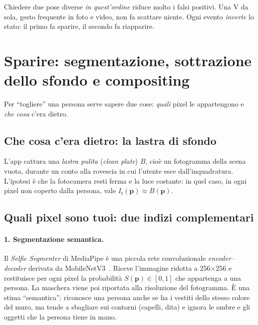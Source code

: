 \documentclass[11pt,a4paper]{article}
\newcommand{\vect}[1]{\mathbf{#1}}
\begin{document}
Chiedere due pose diverse \emph{in quest'ordine} riduce molto i falsi positivi. Una V da sola,
gesto frequente in foto e video, non fa scattare niente. Ogni evento \emph{inverte} lo stato:
il primo fa sparire, il secondo fa riapparire.

\section{Sparire: segmentazione, sottrazione dello sfondo e compositing}
\label{sec:sparire}

Per ``togliere'' una persona serve sapere due cose: \emph{quali} pixel le appartengono e
\emph{che cosa} c'era dietro.

\subsection{Che cosa c'era dietro: la lastra di sfondo}
L'app cattura una \emph{lastra pulita} (\emph{clean plate}) $B$, cioè un fotogramma della scena
vuota, durante un conto alla rovescia in cui l'utente esce dall'inquadratura. L'ipotesi è che la
fotocamera resti ferma e la luce costante: in quel caso, in ogni pixel non coperto dalla persona,
vale $I_t(\vect{p})\approx B(\vect{p})$.

\subsection{Quali pixel sono tuoi: due indizi complementari}

\paragraph{1. Segmentazione semantica.} Il \emph{Selfie Segmenter} di MediaPipe è una piccola rete
convoluzionale \emph{encoder--decoder} derivata da MobileNetV3~\cite{howard2019mobilenetv3}.
Riceve l'immagine ridotta a 256$\times$256 e restituisce per ogni pixel la probabilità
$S(\vect{p})\in[0,1]$ che appartenga a una persona. La maschera viene poi riportata alla
risoluzione del fotogramma. È una stima ``semantica'': riconosce una persona anche se ha i
vestiti dello stesso colore del muro, ma tende a sbagliare sui contorni (capelli, dita) e ignora
le ombre e gli oggetti che la persona tiene in mano.
\end{document}

